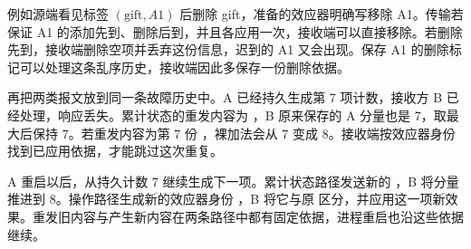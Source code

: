 例如源端看见标签 $(\mathrm{gift},A1)$ 后删除 gift，准备的效应器明确写移除 A1。传输若保证 A1 的添加先到、删除后到，并且各应用一次，接收端可以直接移除。若删除先到，接收端删除空项并丢弃这份信息，迟到的 A1 又会出现。保存 A1 的删除标记可以处理这条乱序历史，接收端因此多保存一份删除依据。

再把两类报文放到同一条故障历史中。A 已经持久生成第 7 项计数，接收方 B 已经处理，响应丢失。累计状态的重发内容为 ，B 原来保存的 A 分量也是 7，取最大后保持 7。若重发内容为第 7 份 ，裸加法会从 7 变成 8。接收端按效应器身份  找到已应用依据，才能跳过这次重复。


A 重启以后，从持久计数 7 继续生成下一项。累计状态路径发送新的 ，B 将分量推进到 8。操作路径生成新的效应器身份 ，B 将它与原  区分，并应用这一项新效果。重发旧内容与产生新内容在两条路径中都有固定依据，进程重启也沿这些依据继续。
\FloatBarrier
